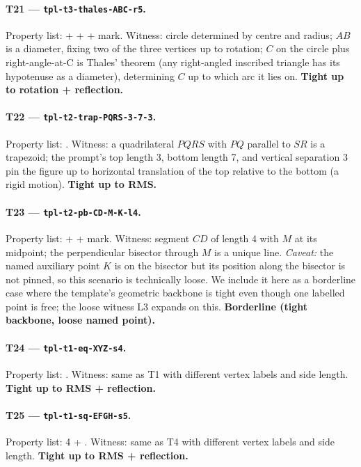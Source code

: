 \paragraph{T21 --- \texttt{tpl-t3-thales-ABC-r5}.}
Property list:  +  +  + mark.
Witness: circle determined by centre and radius; $AB$ is a diameter, fixing two of the three vertices up to rotation; $C$ on the circle plus right-angle-at-C is Thales' theorem (any right-angled inscribed triangle has its hypotenuse as a diameter), determining $C$ up to which arc it lies on.
\textbf{Tight up to rotation + reflection.}

\paragraph{T22 --- \texttt{tpl-t2-trap-PQRS-3-7-3}.}
Property list: .
Witness: a quadrilateral $PQRS$ with $PQ$ parallel to $SR$ is a trapezoid; the prompt's top length 3, bottom length 7, and vertical separation 3 pin the figure up to horizontal translation of the top relative to the bottom (a rigid motion).
\textbf{Tight up to RMS.}

\paragraph{T23 --- \texttt{tpl-t2-pb-CD-M-K-l4}.}
Property list:  +  + mark.
Witness: segment $CD$ of length 4 with $M$ at its midpoint; the perpendicular bisector through $M$ is a unique line.
\emph{Caveat:} the named auxiliary point $K$ is on the bisector but its position along the bisector is not pinned, so this scenario is technically loose. We include it here as a borderline case where the template's geometric backbone is tight even though one labelled point is free; the loose witness L3 expands on this.
\textbf{Borderline (tight backbone, loose named point).}

\paragraph{T24 --- \texttt{tpl-t1-eq-XYZ-s4}.}
Property list: .
Witness: same as T1 with different vertex labels and side length.
\textbf{Tight up to RMS + reflection.}

\paragraph{T25 --- \texttt{tpl-t1-sq-EFGH-s5}.}
Property list: 4  + .
Witness: same as T4 with different vertex labels and side length.
\textbf{Tight up to RMS + reflection.}

